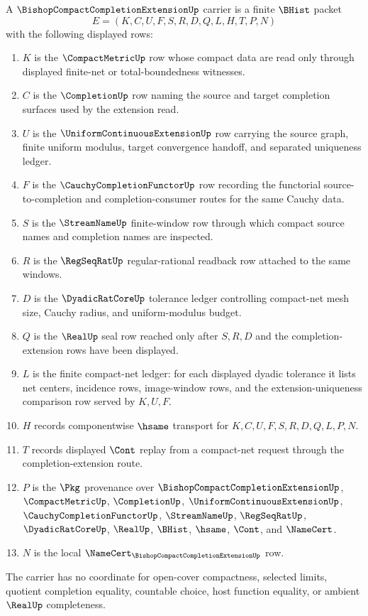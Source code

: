 \begin{definition}
\label{def:bishop-compact-completion-extension-carrier}
A $\BishopCompactCompletionExtensionUp$ carrier is a finite $\BHist$ packet
$$
E=(K,C,U,F,S,R,D,Q,L,H,T,P,N)
$$
with the following displayed rows:
\begin{enumerate}
\item $K$ is the $\CompactMetricUp$ row whose compact data are read only
through displayed finite-net or total-boundedness witnesses.
\item $C$ is the $\CompletionUp$ row naming the source and target completion
surfaces used by the extension read.
\item $U$ is the $\UniformContinuousExtensionUp$ row carrying the source
graph, finite uniform modulus, target convergence handoff, and separated
uniqueness ledger.
\item $F$ is the $\CauchyCompletionFunctorUp$ row recording the functorial
source-to-completion and completion-consumer routes for the same Cauchy data.
\item $S$ is the $\StreamNameUp$ finite-window row through which compact
source names and completion names are inspected.
\item $R$ is the $\RegSeqRatUp$ regular-rational readback row attached to the
same windows.
\item $D$ is the $\DyadicRatCoreUp$ tolerance ledger controlling compact-net
mesh size, Cauchy radius, and uniform-modulus budget.
\item $Q$ is the $\RealUp$ seal row reached only after $S,R,D$ and the
completion-extension rows have been displayed.
\item $L$ is the finite compact-net ledger: for each displayed dyadic
tolerance it lists net centers, incidence rows, image-window rows, and the
extension-uniqueness comparison row served by $K,U,F$.
\item $H$ records componentwise $\hsame$ transport for $K,C,U,F,S,R,D,Q,L,P,N$.
\item $T$ records displayed $\Cont$ replay from a compact-net request through
the completion-extension route.
\item $P$ is the $\Pkg$ provenance over $\BishopCompactCompletionExtensionUp$,
$\CompactMetricUp$, $\CompletionUp$, $\UniformContinuousExtensionUp$,
$\CauchyCompletionFunctorUp$, $\StreamNameUp$, $\RegSeqRatUp$,
$\DyadicRatCoreUp$, $\RealUp$, $\BHist$, $\hsame$, $\Cont$, and $\NameCert$.
\item $N$ is the local $\NameCert_{\BishopCompactCompletionExtensionUp}$ row.
\end{enumerate}
The carrier has no coordinate for open-cover compactness, selected limits,
quotient completion equality, countable choice, host function equality, or
ambient $\RealUp$ completeness.
\end{definition}

